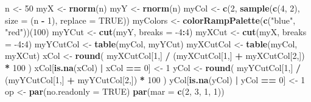 \documentclass[]{book}
\newenvironment{Shaded}{\begin{snugshade}}{\end{snugshade}}
\newcommand{\DataTypeTok}[1]{\textcolor[rgb]{0.13,0.29,0.53}{#1}}
\newcommand{\DecValTok}[1]{\textcolor[rgb]{0.00,0.00,0.81}{#1}}
\newcommand{\KeywordTok}[1]{\textcolor[rgb]{0.13,0.29,0.53}{\textbf{#1}}}
\newcommand{\NormalTok}[1]{#1}
\newcommand{\OperatorTok}[1]{\textcolor[rgb]{0.81,0.36,0.00}{\textbf{#1}}}
\newcommand{\OtherTok}[1]{\textcolor[rgb]{0.56,0.35,0.01}{#1}}
\newcommand{\StringTok}[1]{\textcolor[rgb]{0.31,0.60,0.02}{#1}}
\begin{document}
\begin{Shaded}
\begin{Highlighting}[]
\NormalTok{n <-}\StringTok{ }\DecValTok{50}
\NormalTok{myX <-}\StringTok{ }\KeywordTok{rnorm}\NormalTok{(n)}
\NormalTok{myY <-}\StringTok{ }\KeywordTok{rnorm}\NormalTok{(n)}
\NormalTok{myCol <-}\StringTok{ }\KeywordTok{c}\NormalTok{(}\DecValTok{2}\NormalTok{, }\KeywordTok{sample}\NormalTok{(}\KeywordTok{c}\NormalTok{(}\DecValTok{4}\NormalTok{, }\DecValTok{2}\NormalTok{), }\DataTypeTok{size =}\NormalTok{ (n }\OperatorTok{-}\StringTok{ }\DecValTok{1}\NormalTok{), }\DataTypeTok{replace =} \OtherTok{TRUE}\NormalTok{))}
\NormalTok{myColors <-}\StringTok{ }\KeywordTok{colorRampPalette}\NormalTok{(}\KeywordTok{c}\NormalTok{(}\StringTok{"blue"}\NormalTok{, }\StringTok{"red"}\NormalTok{))(}\DecValTok{100}\NormalTok{)}
\NormalTok{myYCut <-}\StringTok{ }\KeywordTok{cut}\NormalTok{(myY, }\DataTypeTok{breaks =} \DecValTok{-4}\OperatorTok{:}\DecValTok{4}\NormalTok{)}
\NormalTok{myXCut <-}\StringTok{ }\KeywordTok{cut}\NormalTok{(myX, }\DataTypeTok{breaks =} \DecValTok{-4}\OperatorTok{:}\DecValTok{4}\NormalTok{)}
\NormalTok{myYCutCol <-}\StringTok{ }\KeywordTok{table}\NormalTok{(myCol, myYCut)}
\NormalTok{myXCutCol <-}\StringTok{ }\KeywordTok{table}\NormalTok{(myCol, myXCut)}
\NormalTok{xCol <-}\StringTok{ }\KeywordTok{round}\NormalTok{(}
\NormalTok{  myXCutCol[}\DecValTok{1}\NormalTok{,] }\OperatorTok{/}\StringTok{ }\NormalTok{(myXCutCol[}\DecValTok{1}\NormalTok{,] }\OperatorTok{+}\StringTok{ }\NormalTok{myXCutCol[}\DecValTok{2}\NormalTok{,]) }\OperatorTok{*}\StringTok{ }\DecValTok{100}
\NormalTok{)}
\NormalTok{xCol[}\KeywordTok{is.na}\NormalTok{(xCol) }\OperatorTok{|}\StringTok{ }\NormalTok{xCol }\OperatorTok{==}\StringTok{ }\DecValTok{0}\NormalTok{] <-}\StringTok{ }\DecValTok{1}
\NormalTok{yCol <-}\StringTok{ }\KeywordTok{round}\NormalTok{(}
\NormalTok{  myYCutCol[}\DecValTok{1}\NormalTok{,] }\OperatorTok{/}\StringTok{ }\NormalTok{(myYCutCol[}\DecValTok{1}\NormalTok{,] }\OperatorTok{+}\StringTok{ }\NormalTok{myYCutCol[}\DecValTok{2}\NormalTok{,]) }\OperatorTok{*}\StringTok{ }\DecValTok{100}
\NormalTok{)}
\NormalTok{yCol[}\KeywordTok{is.na}\NormalTok{(yCol) }\OperatorTok{|}\StringTok{ }\NormalTok{yCol }\OperatorTok{==}\StringTok{ }\DecValTok{0}\NormalTok{] <-}\StringTok{ }\DecValTok{1}
\NormalTok{op <-}\StringTok{ }\KeywordTok{par}\NormalTok{(}\DataTypeTok{no.readonly =} \OtherTok{TRUE}\NormalTok{)}
\KeywordTok{par}\NormalTok{(}\DataTypeTok{mar =} \KeywordTok{c}\NormalTok{(}\DecValTok{2}\NormalTok{, }\DecValTok{3}\NormalTok{, }\DecValTok{1}\NormalTok{, }\DecValTok{1}\NormalTok{))}

\end{Highlighting}
\end{Shaded}
\end{document}
